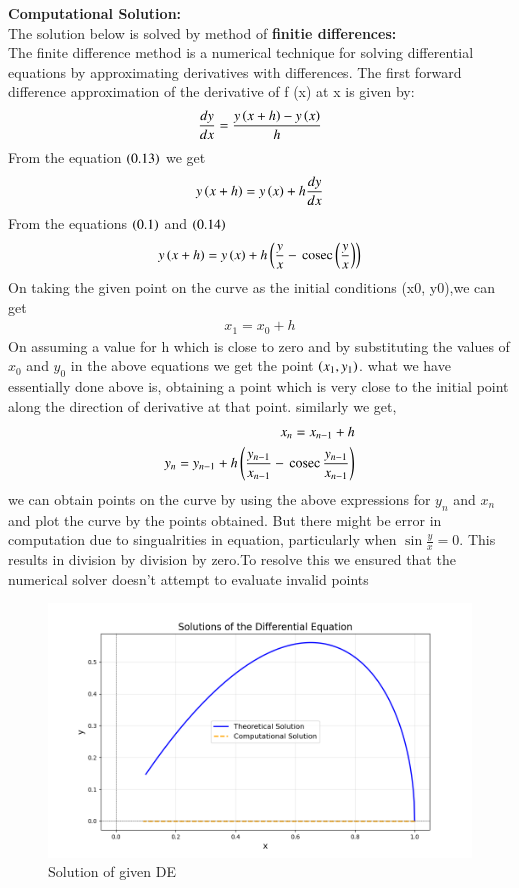 \documentclass[journal]{IEEEtran}
\begin{document}
\textbf{Computational Solution:} \\
The solution below is solved by method of \textbf{finitie differences:}\\
The finite difference method is a numerical technique for solving differential equations by approximating derivatives with differences.
The first forward difference approximation of the derivative of f (x) at x is given by:
\begin{align}
	\frac{dy}{dx} = \frac{y\left(x+h\right)-y\left(x\right)}{h}
\end{align}
From the equation $\left(0.13\right)$ we get
\begin{align}
	y\left(x+h\right) = y\left(x\right) +h\frac{dy}{dx}
\end{align}
From the equations $\left(0.1\right)$ and $\left(0.14\right)$
\begin{align}
	y\left(x+h\right) = y\left(x\right) + h \left(\frac{y}{x}-\,\text{cosec}\,{\left(\frac{y}{x}\right)}\right)
\end{align}
On taking the given point on the curve as the initial conditions (x0, y0),we can get 
\begin{align}
	x_1 = x_0 + h
\end{align}
On assuming a value for h which is close to zero and by substituting the values of $x_0$
and $y_0$ in the above equations we get the point $\left(x_1, y_1\right)$.
what we have essentially done above is, obtaining a point which is very close to the initial
point along the direction of derivative at that point.
similarly we get,
\begin{align}
	x_n = x_{n-1} + h \\
	y_n = y_{n-1} + h\left(\frac{y_{n-1}}{x_{n-1}} - \,\text{cosec}\,{\frac{y_{n-1}}{x_{n-1}}}\right)
\end{align}
we can obtain points on the curve by using the above expressions for $y_n$ and $x_n$ \\
and plot the curve by the points obtained. But there might be error in computation due to singualrities in equation, particularly when $\sin{\frac{y}{x}=0}$. This results in division by division by zero.To resolve this we ensured that the numerical solver doesn't attempt to evaluate invalid points
\begin{figure}[!ht]
	\centering
	\includegraphics[width = \columnwidth]{figs/Figure_1.png}
	\caption{Solution of given DE}
	\label{fig}
\end{figure}
\end{document}
